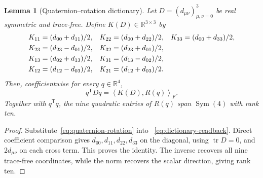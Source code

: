 \documentclass[12pt]{article}
\newtheorem{lemma}[theorem]{Lemma}
\theoremstyle{definition}
\theoremstyle{remark}
\newcommand{\RR}{\mathbb R}
\newcommand{\tr}{\operatorname{tr}}
\newcommand{\ip}[2]{\left\langle #1,#2\right\rangle}
\begin{document}
\begin{lemma}[Quaternion--rotation dictionary]
\label{lem:quaternion-dictionary}
Let $D=(d_{\mu\nu})_{\mu,\nu=0}^3$ be real symmetric and trace-free.  Define
$K(D)\in\RR^{3\times3}$ by
\begin{align}
K_{11}&=(d_{00}+d_{11})/2,&
K_{22}&=(d_{00}+d_{22})/2,&
K_{33}&=(d_{00}+d_{33})/2,\notag\\
K_{23}&=(d_{23}-d_{01})/2,&
K_{32}&=(d_{23}+d_{01})/2,\notag\\
K_{13}&=(d_{02}+d_{13})/2,&
K_{31}&=(d_{13}-d_{02})/2,\label{eq:inverse-dictionary}\\
K_{12}&=(d_{12}-d_{03})/2,&
K_{21}&=(d_{12}+d_{03})/2.\notag
\end{align}
Then, coefficientwise for every $q\in\RR^4$,
\begin{equation}\label{eq:dictionary-readback}
 q^\mathsf TDq=\ip{K(D)}{R(q)}_F.
\end{equation}
Together with $q^\mathsf Tq$, the nine quadratic entries of $R(q)$ span
$\operatorname{Sym}(4)$ with rank ten.
\end{lemma}

\begin{proof}
Substitute~\eqref{eq:quaternion-rotation} into
~\eqref{eq:dictionary-readback}.  Direct coefficient comparison gives
$d_{00},d_{11},d_{22},d_{33}$ on the diagonal, using $\tr D=0$, and
$2d_{\mu\nu}$ on each cross term.  This proves the identity.  The inverse recovers
all nine trace-free coordinates, while the norm recovers the scalar
direction, giving rank ten.
\end{proof}
\end{document}
